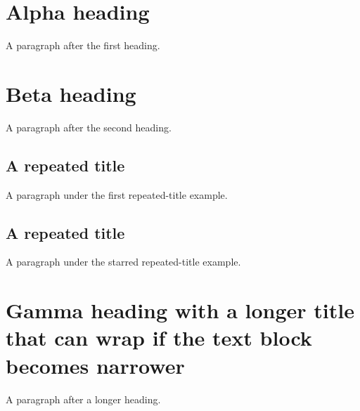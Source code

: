 \documentclass[10pt]{article}
\begin{document}
\section{Alpha heading}
A paragraph after the first heading.

\section{Beta heading}
A paragraph after the second heading.

\subsection{A repeated title}
A paragraph under the first repeated-title example.

\subsection*{A repeated title}
A paragraph under the starred repeated-title example.

\section{Gamma heading with a longer title that can wrap if the text block becomes narrower}
A paragraph after a longer heading.
\end{document}
